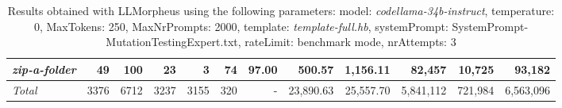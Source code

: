 \begin{table*}
{\begin{tabular}{l||r|r|r|r|r|r||r|r||r|r|r}
   \hline
   \textit{zip-a-folder} & 49 & 100 & 23 & 3 & 74 & 97.00 & 500.57 & 1,156.11 & 82,457 & 10,725 & 93,182 \\ 
   \hline
   \textit{Total} & 3376 & 6712 & 3237 & 3155 & 320 & - & 23,890.63  & 25,557.70 & 5,841,112 & 721,984 & 6,563,096 \\ 
 \end{tabular}
 }
 \caption{Results obtained with LLMorpheus using the following parameters: 
   model: \textit{codellama-34b-instruct}, 
   temperature: 0, 
   MaxTokens: 250, 
   MaxNrPrompts: 2000, 
   template: \textit{template-full.hb}, 
   systemPrompt: SystemPrompt-MutationTestingExpert.txt, 
   rateLimit: benchmark mode, 
   nrAttempts: 3  
 }
\end{table*}

